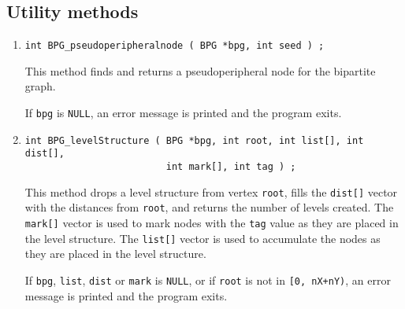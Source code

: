 \subsection{Utility methods}
\label{subsection:BPG:proto:utilities}
\par
\begin{enumerate}
\item
\begin{verbatim}
int BPG_pseudoperipheralnode ( BPG *bpg, int seed ) ;
\end{verbatim}
This method finds and returns a pseudoperipheral node for the
bipartite graph.
\par {}
If {\tt bpg} is {\tt NULL},
an error message is printed and the program exits.
\item
\begin{verbatim}
int BPG_levelStructure ( BPG *bpg, int root, int list[], int dist[],
                         int mark[], int tag ) ;
\end{verbatim}
This method drops a level structure from vertex {\tt root}, fills
the {\tt dist[]} vector with the distances from {\tt root},
and returns the number of levels created.
The {\tt mark[]} vector is used to mark nodes with the {\tt tag}
value as they are placed in the level structure.
The {\tt list[]} vector is used to accumulate the nodes as they are
placed in the level structure.
\par {}
If {\tt bpg}, {\tt list}, {\tt dist} or {\tt mark} is {\tt NULL},
or if {\tt root} is not in {\tt [0, nX+nY)},
an error message is printed and the program exits.
\end{enumerate}
\par
